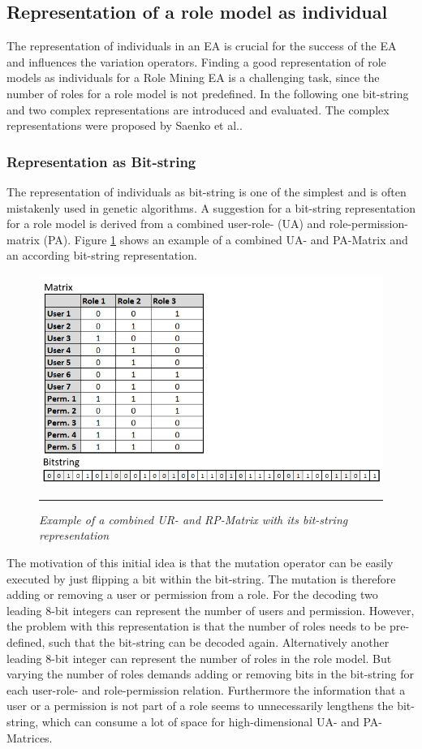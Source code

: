     \subsection{Representation of a role model as individual}
    The representation of individuals in an EA is crucial for the success of the EA and influences the variation operators. Finding a good representation of role models as individuals for a Role Mining EA is a challenging task, since the number of roles for a role model is not predefined. In the following one bit-string and two complex representations are introduced and evaluated. The complex representations were proposed by Saenko et al.\cite{saenko2012design}.
        \subsubsection{Representation as Bit-string}
        The representation of individuals as bit-string is one of the simplest and is often mistakenly used in genetic algorithms\cite{Eiben}. A suggestion for a bit-string representation for a role model is derived from a combined user-role- (UA) and role-permission-matrix (PA). Figure \ref{fig:representation1} shows an example of a combined UA- and PA-Matrix and an according bit-string representation.
        \begin{figure}
            \centering
            \includegraphics[scale=0.75]{./Figures/Representation1.png}
            \rule{20em}{0.5pt}
            \caption{\textit{Example of a combined UR- and RP-Matrix with its bit-string representation}}
            \label{fig:representation1}
        \end{figure}
        The motivation of this initial idea is that the mutation operator can be easily executed by just flipping a bit within the bit-string. The mutation is therefore adding or removing a user or permission from a role. For the decoding two leading 8-bit integers can represent the number of users and permission. However, the problem with this representation is that the number of roles needs to be pre-defined, such that the bit-string can be decoded again. Alternatively another leading 8-bit integer can represent the number of roles in the role model. But varying the number of roles demands adding or removing bits in the bit-string for each user-role- and role-permission relation. Furthermore the information that a user or a permission is not part of a role seems to unnecessarily lengthens the bit-string, which can consume a lot of space for high-dimensional UA- and PA-Matrices.
